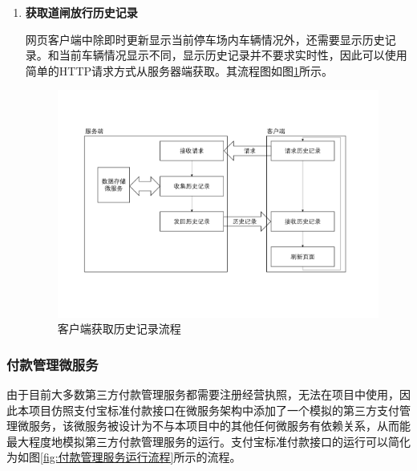 \documentclass[a4paper]{ctexart}
\begin{document}
\begin{enumerate}[label=\bf{\arabic*、}]
	\item {\bf 获取道闸放行历史记录}

	      网页客户端中除即时更新显示当前停车场内车辆情况外，还需要显示历史记录。和当前车辆情况显示不同，显示历史记录并不要求实时性，因此可以使用简单的HTTP请求方式从服务器端获取。其流程图如图\ref{fig:客户端获取历史记录流程}所示。

	      \begin{figure}[htbp]
		      \centering
		      \includegraphics[width=\textwidth]{figure/server-history.pdf}
		      \caption{客户端获取历史记录流程}\label{fig:客户端获取历史记录流程}
	      \end{figure}
\end{enumerate}

\subsubsection{付款管理微服务}\label{付款管理微服务}
由于目前大多数第三方付款管理服务都需要注册经营执照，无法在项目中使用，因此本项目仿照支付宝标准付款接口在微服务架构中添加了一个模拟的第三方支付管理微服务，该微服务被设计为不与本项目中的其他任何微服务有依赖关系，从而能最大程度地模拟第三方付款管理服务的运行。支付宝标准付款接口的运行可以简化为如图\ref{fig:付款管理服务运行流程}所示的流程。
\end{document}
